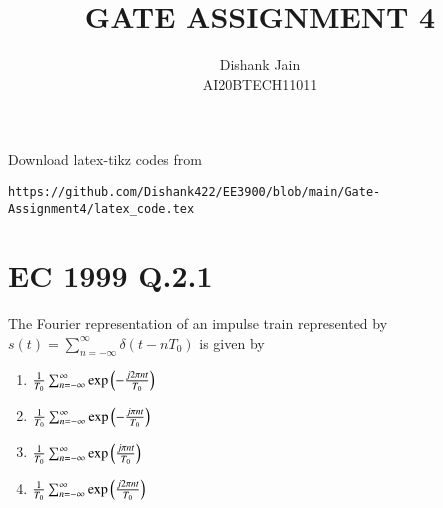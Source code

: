 \documentclass[journal,12pt,twocolumn]{IEEEtran}
\begin{document}
     \def\centbox#1{\makebox[0in]{#1}}
     \def\topbox#1{\raisebox{-\baselineskip}[0in][0in]{#1}}
     \def\midbox#1{\raisebox{-0.5\baselineskip}[0in][0in]{#1}}
\vspace{3cm}
\title{GATE ASSIGNMENT 4}
\author{Dishank Jain \\ AI20BTECH11011}
\maketitle
\newpage
\bigskip
\renewcommand{\thefigure}{\theenumi}
\renewcommand{\thetable}{\theenumi}
Download latex-tikz codes from
%
\begin{lstlisting}
https://github.com/Dishank422/EE3900/blob/main/Gate-Assignment4/latex_code.tex
\end{lstlisting}
%
\section{EC 1999 Q.2.1}
The Fourier representation of an impulse train represented by $s(t) = \sum_{n=-\infty}^{\infty}\delta(t-nT_0)$ is given by
\begin{enumerate}[label=(\alph*)]
\setlength\itemsep{0.5em}
    \item $\frac{1}{T_0}\sum_{n=-\infty}^{\infty}\exp\left(-\frac{j2\pi nt}{T_0}\right)$
    \item $\frac{1}{T_0}\sum_{n=-\infty}^{\infty}\exp\left(-\frac{j\pi nt}{T_0}\right)$
    \item $\frac{1}{T_0}\sum_{n=-\infty}^{\infty}\exp\left(\frac{j\pi nt}{T_0}\right)$
    \item $\frac{1}{T_0}\sum_{n=-\infty}^{\infty}\exp\left(\frac{j2\pi nt}{T_0}\right)$
\end{enumerate}
\end{document}
